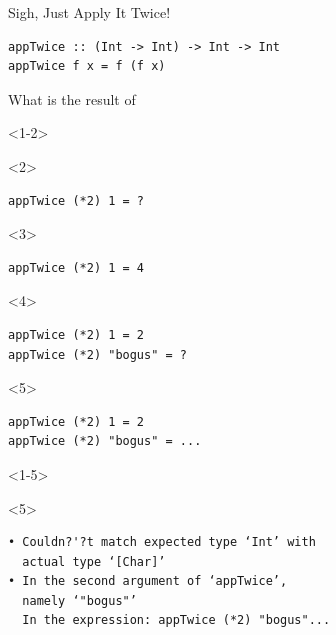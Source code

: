 \documentclass{beamer}
\begin{document}




\begin{frame}[fragile]{Sigh, Just Apply It Twice!}
\begin{verbatim}
appTwice :: (Int -> Int) -> Int -> Int
appTwice f x = f (f x)
\end{verbatim}

\centering What is the result of\dotso

\begin{onlyenv}<1-2>
\begin{uncoverenv}<2>
\begin{verbatim}
appTwice (*2) 1 = ?
\end{verbatim}
\end{uncoverenv}
\end{onlyenv}

\begin{onlyenv}<3>
\begin{verbatim}
appTwice (*2) 1 = 4
\end{verbatim}
\end{onlyenv}

\begin{onlyenv}<4>
\begin{verbatim}
appTwice (*2) 1 = 2
appTwice (*2) "bogus" = ?
\end{verbatim}
\end{onlyenv}

\begin{onlyenv}<5>
\begin{verbatim}
appTwice (*2) 1 = 2
appTwice (*2) "bogus" = ...
\end{verbatim}
\end{onlyenv}

\begin{onlyenv}<1-5>
\begin{uncoverenv}<5>
\begin{alertbox}
\begin{verbatim}
• Couldn?'?t match expected type ‘Int’ with
  actual type ‘[Char]’
• In the second argument of ‘appTwice’,
  namely ‘"bogus"’
  In the expression: appTwice (*2) "bogus"...
\end{verbatim}
\end{alertbox}
\end{uncoverenv}
\end{onlyenv}


\end{frame}
\end{document}
